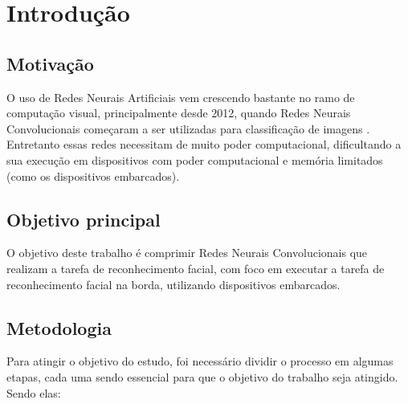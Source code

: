 \chapter{Introdução}

\section{Motivação}
O uso de Redes Neurais Artificiais vem crescendo bastante no ramo de computação visual, principalmente desde 2012,
quando Redes Neurais Convolucionais começaram a ser utilizadas para classificação de imagens \cite{alexnet}. Entretanto
essas redes necessitam de muito poder computacional, dificultando a sua execução em dispositivos com poder
computacional e memória limitados (como os dispositivos embarcados).


\section{Objetivo principal}

O objetivo deste trabalho é comprimir Redes Neurais Convolucionais que realizam a tarefa de reconhecimento facial,
com foco em executar a tarefa de reconhecimento facial na borda, utilizando dispositivos embarcados.

\section{Metodologia}
Para atingir o objetivo do estudo, foi necessário dividir o processo em algumas etapas, cada uma sendo
essencial para que o objetivo do trabalho seja atingido. Sendo elas:

